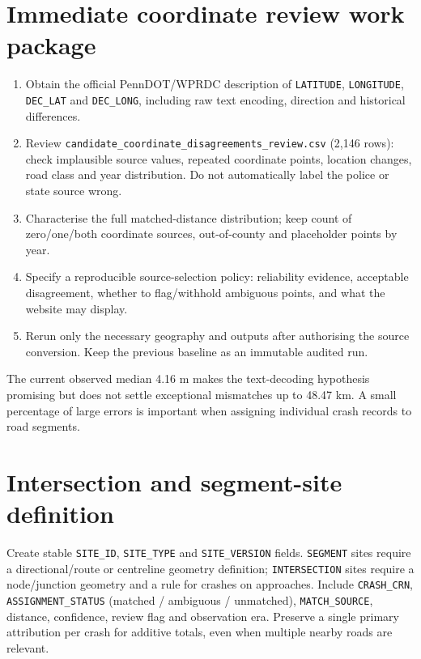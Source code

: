 \documentclass[11pt,a4paper,openany]{report}
\newcommand{\pathcode}[1]{\nolinkurl{#1}}
\begin{document}
\section{Immediate coordinate review work package}
\begin{enumerate}
\item Obtain the official PennDOT/WPRDC description of \pathcode{LATITUDE}, \pathcode{LONGITUDE}, \pathcode{DEC_LAT} and \pathcode{DEC_LONG}, including raw text encoding, direction and historical differences.
\item Review \pathcode{candidate_coordinate_disagreements_review.csv} (2,146 rows): check implausible source values, repeated coordinate points, location changes, road class and year distribution. Do not automatically label the police or state source wrong.
\item Characterise the full matched-distance distribution; keep count of zero/one/both coordinate sources, out-of-county and placeholder points by year.
\item Specify a reproducible source-selection policy: reliability evidence, acceptable disagreement, whether to flag/withhold ambiguous points, and what the website may display.
\item Rerun only the necessary geography and outputs after authorising the source conversion. Keep the previous baseline as an immutable audited run.
\end{enumerate}
The current observed median 4.16 m makes the text-decoding hypothesis promising but does not settle exceptional mismatches up to 48.47 km. A small percentage of large errors is important when assigning individual crash records to road segments.

\section{Intersection and segment-site definition}
Create stable \pathcode{SITE_ID}, \pathcode{SITE_TYPE} and \pathcode{SITE_VERSION} fields. \pathcode{SEGMENT} sites require a directional/route or centreline geometry definition; \pathcode{INTERSECTION} sites require a node/junction geometry and a rule for crashes on approaches. Include \pathcode{CRASH_CRN}, \pathcode{ASSIGNMENT_STATUS} (matched / ambiguous / unmatched), \pathcode{MATCH_SOURCE}, distance, confidence, review flag and observation era. Preserve a single primary attribution per crash for additive totals, even when multiple nearby roads are relevant.
\end{document}
